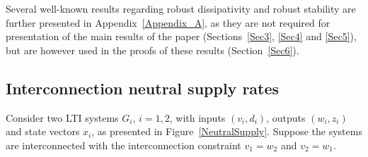 \documentclass[11pt,a4paper,oneside,DIV=12,headings=small]{scrartcl}
\theoremstyle{plain}
\newtheorem{remark}[theorem]{Remark}
\begin{document}

Several well-known results regarding robust dissipativity and robust stability are further presented in Appendix~\ref{Appendix_A}, as they are not required for presentation of the main results of the paper (Sections~\ref{Sec3}, \ref{Sec4} and \ref{Sec5}), but are however used in the proofs of these results (Section~\ref{Sec6}).  



\subsection{Interconnection neutral supply rates}
\label{Sec2_C}
Consider two LTI systems $G_i$, $i=1,2$, with inputs $(v_i,d_i)$, outputs $(w_i,z_i)$ and state vectors $x_i$, as presented in Figure~\ref{NeutralSupply}. Suppose the systems are interconnected with the interconnection constraint $v_1=w_2$ and $v_2=w_1$.
\end{document}
